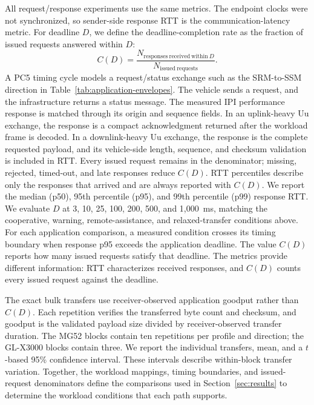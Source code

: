 All request/response experiments use the same metrics. The endpoint clocks were not
synchronized, so sender-side response RTT is the
communication-latency metric. For deadline $D$, we define the deadline-completion
rate as the fraction of issued requests answered within $D$:
\begin{equation}
 C(D)=
 \frac{N_{\mathrm{responses\ received\ within}\ D}}
 {N_{\mathrm{issued\ requests}}}.
 \label{eq:deadline-completion}
\end{equation}
A PC5 timing cycle models a request/status exchange such as the SRM-to-SSM
direction in Table~\ref{tab:application-envelopes}. The vehicle sends a request,
and the infrastructure returns a status message. The measured IPI performance
response is matched through its origin and sequence fields. In an
uplink-heavy Uu exchange, the response is a compact
acknowledgment returned after the workload frame is decoded. In a
downlink-heavy Uu exchange, the response is the complete requested payload, and
its vehicle-side length, sequence, and checksum validation is included in RTT.
Every issued request remains in the denominator; missing,
rejected, timed-out, and late responses reduce $C(D)$. RTT
percentiles describe only the responses that arrived and are always reported
with $C(D)$. We report the median (p50), 95th percentile (p95), and 99th
percentile (p99) response RTT. We evaluate $D$ at 3, 10, 25, 100, 200, 500, and 1,000~ms, matching
the cooperative, warning, remote-assistance, and relaxed-transfer conditions
above. For each application comparison, a measured condition crosses its timing
boundary when response p95 exceeds the application deadline. The value $C(D)$
reports how many issued requests satisfy that deadline. The metrics provide
different information: RTT characterizes received responses, and $C(D)$ counts
every issued request against the deadline.

The exact bulk transfers use receiver-observed application goodput rather than
$C(D)$. Each repetition verifies the transferred byte count and checksum, and
goodput is the validated payload size divided by receiver-observed transfer
duration. The MG52 blocks contain ten repetitions per profile and direction;
the GL-X3000 blocks contain three. We report
the individual transfers, mean, and a $t$-based 95\% confidence interval.
These intervals describe within-block transfer variation.
Together, the workload mappings, timing boundaries, and issued-request
denominators define the comparisons used in Section~\ref{sec:results} to
determine the workload conditions that each path supports.
